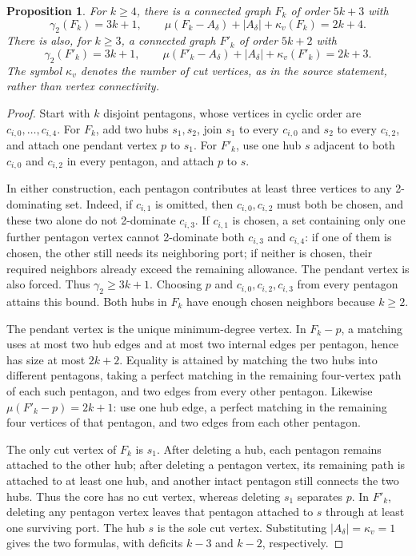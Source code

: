 \documentclass[11pt,a4paper]{article}
\newtheorem{proposition}[theorem]{Proposition}
\theoremstyle{remark}
\begin{document}
\begin{proposition}\label{r7:family392c}
For $k\ge4$, there is a connected graph $F_k$ of order $5k+3$ with
\[
 \gamma_2(F_k)=3k+1,
 \qquad \mu(F_k-A_\delta)+|A_\delta|+\kappa_v(F_k)=2k+4.
\]
There is also, for $k\ge3$, a connected graph $F'_k$ of order $5k+2$
with
\[
 \gamma_2(F'_k)=3k+1,
 \qquad \mu(F'_k-A_\delta)+|A_\delta|+\kappa_v(F'_k)=2k+3.
\]
The symbol $\kappa_v$ denotes the number of cut vertices, as in the
source statement, rather than vertex connectivity.
\end{proposition}
\begin{proof}
Start with $k$ disjoint pentagons, whose vertices in cyclic order are
$c_{i,0},\ldots,c_{i,4}$. For $F_k$, add two hubs $s_1,s_2$, join
$s_1$ to every $c_{i,0}$ and $s_2$ to every $c_{i,2}$, and attach one
pendant vertex $p$ to $s_1$. For $F'_k$, use one hub $s$ adjacent to
both $c_{i,0}$ and $c_{i,2}$ in every pentagon, and attach $p$ to $s$.

In either construction, each pentagon contributes at least three
vertices to any 2-dominating set. Indeed, if $c_{i,1}$ is omitted,
then $c_{i,0},c_{i,2}$ must both be chosen, and these two alone do not
2-dominate $c_{i,3}$. If $c_{i,1}$ is chosen, a set containing only
one further pentagon vertex cannot 2-dominate both $c_{i,3}$ and
$c_{i,4}$: if one of them is chosen, the other still needs its
neighboring port; if neither is chosen, their required neighbors
already exceed the remaining allowance. The pendant vertex is also
forced. Thus $\gamma_2\ge3k+1$. Choosing $p$ and
$c_{i,0},c_{i,2},c_{i,3}$ from every pentagon attains this bound.
Both hubs in $F_k$ have enough chosen neighbors because $k\ge2$.

The pendant vertex is the unique minimum-degree vertex. In $F_k-p$,
a matching uses at most two hub edges and at most two internal edges
per pentagon, hence has size at most $2k+2$. Equality is attained by
matching the two hubs into different pentagons, taking a perfect
matching in the remaining four-vertex path of each such pentagon,
and two edges from every other pentagon. Likewise
$\mu(F'_k-p)=2k+1$: use one hub edge, a perfect matching in the
remaining four vertices of that pentagon, and two edges from each
other pentagon.

The only cut vertex of $F_k$ is $s_1$. After deleting a hub, each
pentagon remains attached to the other hub; after deleting a
pentagon vertex, its remaining path is attached to at least one
hub, and another intact pentagon still connects the two hubs.
Thus the core has no cut vertex, whereas deleting $s_1$ separates
$p$. In $F'_k$, deleting any pentagon vertex leaves that pentagon
attached to $s$ through at least one surviving port. The hub $s$ is
the sole cut vertex. Substituting $|A_\delta|=\kappa_v=1$ gives the
two formulas, with deficits $k-3$ and $k-2$, respectively.
\end{proof}
\end{document}

